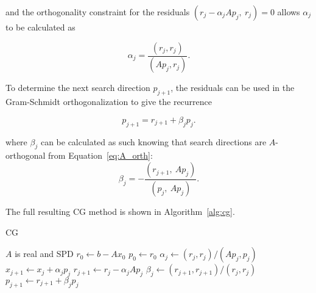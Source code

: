 and the orthogonality constraint for the residuals $\left( r_j - \alpha_j A p_j,\ r_j \right) = 0$  allows $\alpha_j$ to be calculated as

\begin{equation}
    \alpha_j = \frac{\left(r_j, r_j\right)}{\left(Ap_j, r_j\right)}.
\end{equation}

To determine the next search direction $p_{j+1}$, the residuals can be used in the Gram-Schmidt orthogonalization to give the recurrence

\begin{equation}
    p_{j+1} = r_{j+1} + \beta_j p_j.
\end{equation}

where $\beta_j$ can be calculated as such knowing that search directions are $A$-orthogonal from Equation~\ref{eq:A_orth}:
\begin{equation}
    \beta_j = - \frac{\left(r_{j+1},\ Ap_j\right)}{\left(p_j,\ Ap_j\right)}.
\end{equation}

The full resulting CG method is shown in Algorithm~\ref{alg:cg}.

\begin{algorithm}
	\caption{CG}\label{alg:cg}
	\begin{algorithmic}[1]
        \Require $A$ is real and SPD
            \State $r_0 \gets b - Ax_0$
            \State $p_0 \gets r_0$
                \State $\alpha_j \gets \left(r_j, r_j\right)/\left(Ap_j, p_j\right)$
                \State $x_{j+1} \gets x_j + \alpha_j p_j$
                \State $r_{j+1} \gets r_j - \alpha_j A p_j$
                \State $\beta_j \gets \left(r_{j+1}, r_{j+1}\right)/\left(r_j, r_j\right)$
                \State $p_{j+1} \gets r_{j+1} + \beta_j p_j$
            \EndFor
        \EndProcedure
    \end{algorithmic}
\end{algorithm}



